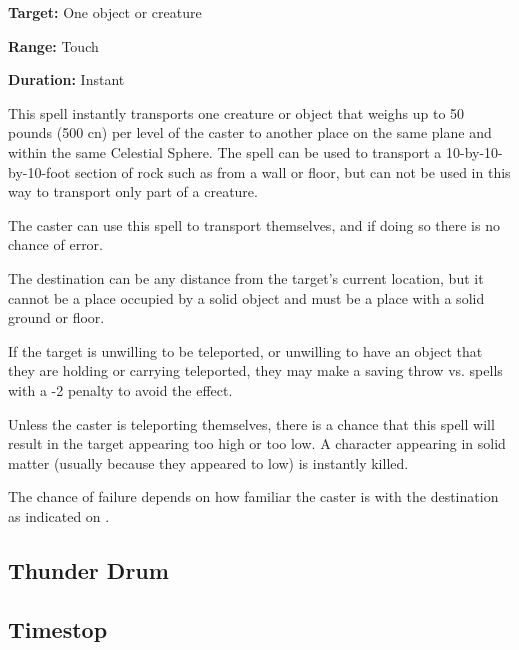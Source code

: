\begin{multicols*}{2}
{\textbf{Target:} One object or creature

\textbf{Range:} Touch

\textbf{Duration:} Instant}

This spell instantly transports one creature or object that weighs up to 50 pounds (500 cn) per level of the caster to another place on the same plane and within the same Celestial Sphere. The spell can be used to transport a 10-by-10-by-10-foot section of rock such as from a wall or floor, but can not be used in this way to transport only part of a creature.

The caster can use this spell to transport themselves, and if doing so there is no chance of error.

The destination can be any distance from the target’s current location, but it cannot be a place occupied by a solid object and must be a place with a solid ground or floor.

If the target is unwilling to be teleported, or unwilling to have an object that they are holding or carrying teleported, they may make a saving throw vs. spells with a -2 penalty to avoid the effect.

Unless the caster is teleporting themselves, there is a chance that this spell will result in the target appearing too high or too low. A character appearing in solid matter (usually because they appeared to low) is instantly killed.

The chance of failure depends on how familiar the caster is with the destination as indicated on .

\subsection{Thunder Drum}\label{spell:Thunder Drum}



\subsection{Timestop}\label{spell:Timestop}
\end{multicols*}
